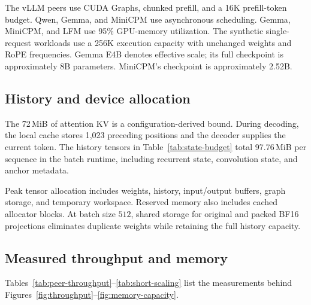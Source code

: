 The vLLM peers use CUDA Graphs, chunked prefill, and a 16K prefill-token budget. Qwen, Gemma, and MiniCPM use asynchronous scheduling. Gemma, MiniCPM, and LFM use 95\% GPU-memory utilization. The synthetic single-request workloads use a 256K execution capacity with unchanged weights and RoPE frequencies. Gemma E4B denotes effective scale; its full checkpoint is approximately 8B parameters. MiniCPM's checkpoint is approximately 2.52B.

\subsection{History and device allocation}
The 72\,MiB of attention KV is a configuration-derived bound. During decoding, the local cache stores 1,023 preceding positions and the decoder supplies the current token. The history tensors in Table~\ref{tab:state-budget} total 97.76\,MiB per sequence in the batch runtime, including recurrent state, convolution state, and anchor metadata.

Peak tensor allocation includes weights, history, input/output buffers, graph storage, and temporary workspace. Reserved memory also includes cached allocator blocks. At batch size $512$, shared storage for original and packed BF16 projections eliminates duplicate weights while retaining the full history capacity.

\subsection{Measured throughput and memory}
Tables~\ref{tab:peer-throughput}--\ref{tab:short-scaling} list the measurements behind Figures~\ref{fig:throughput}--\ref{fig:memory-capacity}.

\PeerThroughputResults
\BatchScalingResults
\ShortScalingResults
